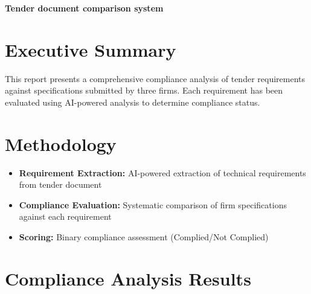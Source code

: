 \documentclass[12pt]{article}
\begin{document}
\begin{center}
    \LARGE \textbf{Tender document comparison system}\\
\end{center}

\vspace{1cm}

\section*{Executive Summary}
This report presents a comprehensive compliance analysis of tender requirements against specifications submitted by three firms. Each requirement has been evaluated using AI-powered analysis to determine compliance status.

\section*{Methodology}
\begin{itemize}
    \item \textbf{Requirement Extraction:} AI-powered extraction of technical requirements from tender document
    \item \textbf{Compliance Evaluation:} Systematic comparison of firm specifications against each requirement  
    \item \textbf{Scoring:} Binary compliance assessment (Complied/Not Complied)
\end{itemize}

\section*{Compliance Analysis Results}
\end{document}
